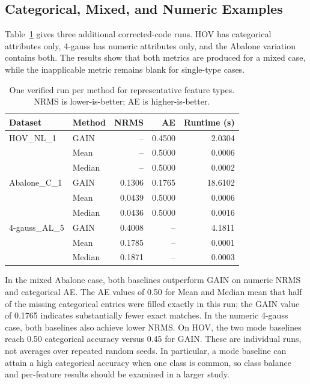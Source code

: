 \documentclass[11pt]{article}
\begin{document}
\subsection{Categorical, Mixed, and Numeric Examples}
Table~\ref{tab:types} gives three additional corrected-code runs. HOV has categorical attributes only, 4-gauss has numeric attributes only, and the Abalone variation contains both. The results show that both metrics are produced for a mixed case, while the inapplicable metric remains blank for single-type cases.

\begin{table}[ht]
\centering
\small
\caption{One verified run per method for representative feature types. NRMS is lower-is-better; AE is higher-is-better.}
\label{tab:types}
\begin{tabular}{llrrr}
\toprule
Dataset & Method & NRMS & AE & Runtime (s) \\
\midrule
HOV\_NL\_1 & GAIN   & --     & 0.4500 & 2.0304 \\
           & Mean   & --     & 0.5000 & 0.0006 \\
           & Median & --     & 0.5000 & 0.0002 \\
\midrule
Abalone\_C\_1 & GAIN   & 0.1306 & 0.1765 & 18.6102 \\
              & Mean   & 0.0439 & 0.5000 & 0.0006 \\
              & Median & 0.0436 & 0.5000 & 0.0016 \\
\midrule
4-gauss\_AL\_5 & GAIN   & 0.4008 & --     & 4.1811 \\
               & Mean   & 0.1785 & --     & 0.0001 \\
               & Median & 0.1871 & --     & 0.0003 \\
\bottomrule
\end{tabular}
\end{table}

In the mixed Abalone case, both baselines outperform GAIN on numeric NRMS and categorical AE. The AE values of 0.50 for Mean and Median mean that half of the missing categorical entries were filled exactly in this run; the GAIN value of 0.1765 indicates substantially fewer exact matches. In the numeric 4-gauss case, both baselines also achieve lower NRMS. On HOV, the two mode baselines reach 0.50 categorical accuracy versus 0.45 for GAIN. These are individual runs, not averages over repeated random seeds. In particular, a mode baseline can attain a high categorical accuracy when one class is common, so class balance and per-feature results should be examined in a larger study.
\end{document}
